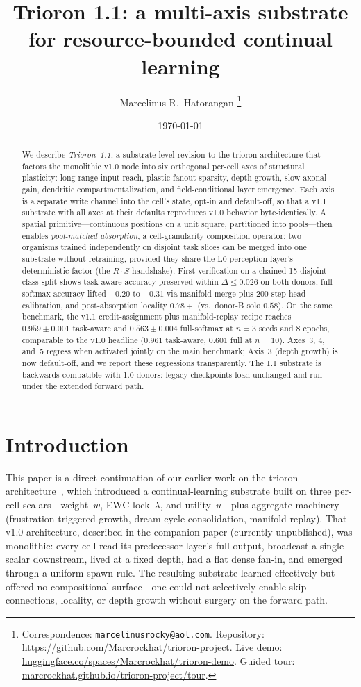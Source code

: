 \documentclass[11pt]{article}
\title{Trioron 1.1: a multi-axis substrate\\
       for resource-bounded continual learning}
\author{Marcelinus R.\ Hatorangan%
        \thanks{Correspondence: \texttt{marcelinusrocky@aol.com}.
                Repository: \url{https://github.com/Marcrockhat/trioron-project}.
                Live demo: \href{https://huggingface.co/spaces/Marcrockhat/trioron-demo}{huggingface.co/spaces/Marcrockhat/trioron-demo}.
                Guided tour: \href{https://marcrockhat.github.io/trioron-project/tour/}{marcrockhat.github.io/trioron-project/tour}.}}
\date{\today}
\begin{document}
\maketitle

\begin{abstract}
We describe \emph{Trioron~1.1}, a substrate-level revision to the
trioron architecture that factors the monolithic v1.0 node into six
orthogonal per-cell axes of structural plasticity: long-range input
reach, plastic fanout sparsity, depth growth, slow axonal gain,
dendritic compartmentalization, and field-conditional layer emergence.
Each axis is a separate write channel into the cell's state, opt-in
and default-off, so that a v1.1 substrate with all axes at their
defaults reproduces v1.0 behavior byte-identically.
A spatial primitive---continuous positions on a unit square,
partitioned into pools---then enables \emph{pool-matched absorption},
a cell-granularity composition operator: two organisms trained
independently on disjoint task slices can be merged into one
substrate without retraining, provided they share the L0 perception
layer's deterministic factor (the $R \cdot S$ handshake).
First verification on a chained-15 disjoint-class split shows
task-aware accuracy preserved within $\Delta \leq 0.026$ on both
donors, full-softmax accuracy lifted $+0.20$ to $+0.31$ via manifold
merge plus 200-step head calibration, and post-absorption locality
$0.78{+}$ (vs.\ donor-B solo $0.58$).
On the same benchmark, the v1.1 credit-assignment plus manifold-replay
recipe reaches $0.959 \pm 0.001$ task-aware and $0.563 \pm 0.004$
full-softmax at $n{=}3$ seeds and 8 epochs, comparable to the v1.0
headline ($0.961$ task-aware, $0.601$ full at $n{=}10$).
Axes~3, 4, and~5 regress when activated jointly on the main benchmark;
Axis~3 (depth growth) is now default-off, and we report these
regressions transparently.
The 1.1 substrate is backwards-compatible with 1.0 donors: legacy
checkpoints load unchanged and run under the extended forward path.
\end{abstract}


\section{Introduction}
\label{sec:intro}

This paper is a direct continuation of our earlier work on the trioron
architecture~\citep{hatorangan2026trioron}, which introduced a
continual-learning substrate built on three per-cell scalars---weight~$w$,
EWC lock~$\lambda$, and utility~$u$---plus aggregate machinery
(frustration-triggered growth, dream-cycle consolidation, manifold
replay).
That v1.0 architecture, described in the companion paper (currently
unpublished), was monolithic: every cell read its predecessor layer's
full output, broadcast a single scalar downstream, lived at a fixed
depth, had a flat dense fan-in, and emerged through a uniform spawn rule.
The resulting substrate learned effectively but offered no compositional
surface---one could not selectively enable skip connections, locality, or
depth growth without surgery on the forward path.
\end{document}

